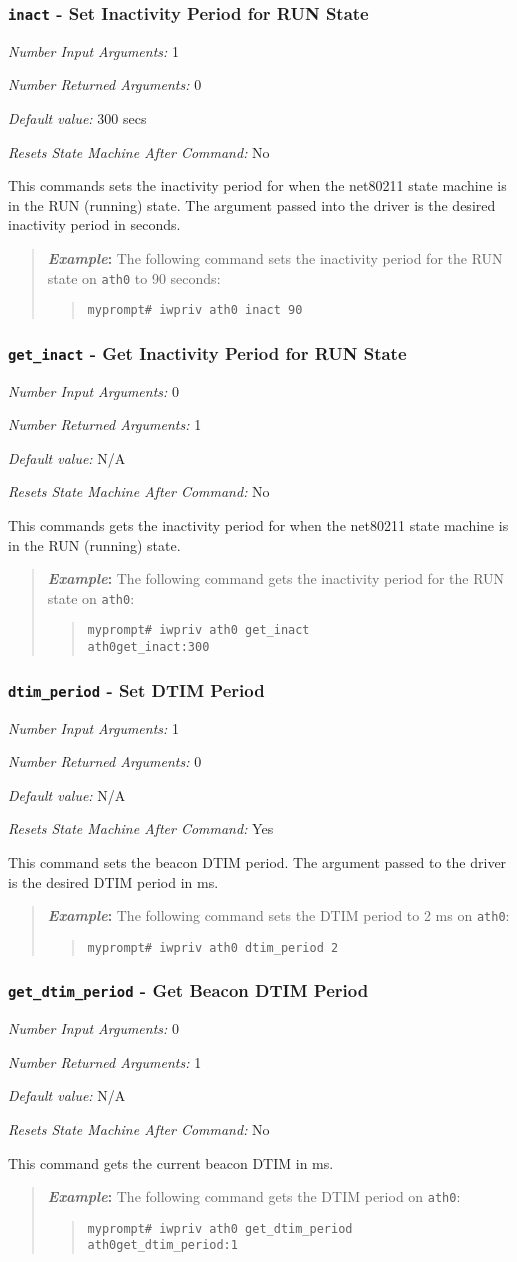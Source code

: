 \documentclass[10pt,fullpage]{article}
\newcommand{\mytt}[1]{{\texttt{#1}}}
\newcommand{\bv}{\begin{verse}}
\newcommand{\ev}{\end{verse}}
\newcommand{\cmd}[1]{{\texttt{myprompt\# #1}}}
\newcommand{\argdesc}[4]{\begin{description}
\itemsep -6pt
\item \textit{Number Input Arguments:} #1
\item \textit{Number Returned Arguments:} #2
\item \textit{Default value:} #3
\item \textit{Resets State Machine After Command:} #4
\end{description}
}
\newenvironment{example}{\begin{quote}\textbf{\textit{Example}:}}{\end{quote}}
\begin{document}
\subsubsection{\mytt{inact} - Set Inactivity Period for RUN
  State}
\argdesc{1}{0}{300 secs}{No}
This commands sets the inactivity period for when the net80211 state
machine is in the RUN (running) state.  The argument passed into the
driver is the desired inactivity period in seconds.
\begin{example}
  The following command sets the inactivity period for the RUN state
  on \mytt{ath0} to 90 seconds:
  \bv
  \cmd{iwpriv ath0 inact 90}
  \ev
\end{example}

\subsubsection{\mytt{get\_inact} - Get Inactivity Period for RUN
  State}
\argdesc{0}{1}{N/A}{No}
This commands gets the inactivity period for when the net80211 state
machine is in the RUN (running) state.
\begin{example}
  The following command gets the inactivity period for the RUN state
  on \mytt{ath0}:
  \bv
  \cmd{iwpriv ath0 get\_inact}\\
  \mytt{ath0\hspace{32pt}get\_inact:300}
  \ev
\end{example}

\subsubsection{\mytt{dtim\_period} - Set DTIM Period}
\argdesc{1}{0}{N/A}{Yes}
This command sets the beacon DTIM period.  The argument passed to the
driver is the desired DTIM period in ms.
\begin{example}
  The following command sets the DTIM period to 2 ms on \mytt{ath0}:
  \bv
  \cmd{iwpriv ath0 dtim\_period 2}
  \ev
\end{example}

\subsubsection{\mytt{get\_dtim\_period} - Get Beacon DTIM Period}
\argdesc{0}{1}{N/A}{No}
This command gets the current beacon DTIM in ms.
\begin{example}
  The following command gets the DTIM period on \mytt{ath0}:
  \bv
  \cmd{iwpriv ath0 get\_dtim\_period}\\
  \mytt{ath0\hspace{32pt}get\_dtim\_period:1}
  \ev
\end{example}
\end{document}
